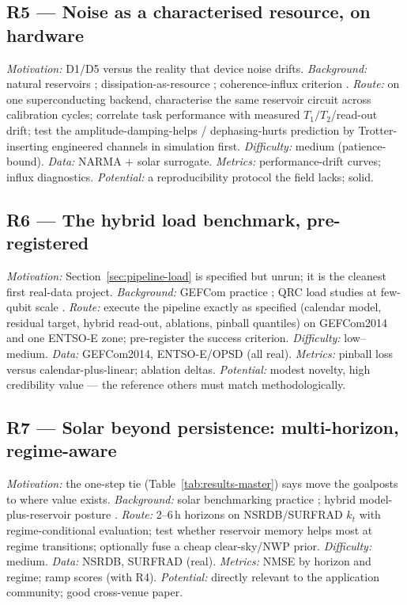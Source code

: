 \subsection*{R5 --- Noise as a characterised resource, on hardware}
\emph{Motivation:} D1/D5 versus the reality that device noise drifts.
\emph{Background:} natural reservoirs \citep{suzuki2022natural};
dissipation-as-resource \citep{sannia2024dissipation}; coherence-influx
criterion \citep{kobayashi2024coherence}. \emph{Route:} on one
superconducting backend, characterise the same reservoir circuit across
calibration cycles; correlate task performance with measured
$T_1/T_2$/read-out drift; test the amplitude-damping-helps /
dephasing-hurts prediction by Trotter-inserting engineered channels in
simulation first. \emph{Difficulty:} medium (patience-bound).
\emph{Data:} NARMA + solar surrogate. \emph{Metrics:} performance-drift
curves; influx diagnostics. \emph{Potential:} a reproducibility protocol
the field lacks; solid.

\subsection*{R6 --- The hybrid load benchmark, pre-registered}
\emph{Motivation:} Section~\ref{sec:pipeline-load} is specified but unrun;
it is the cleanest first real-data project. \emph{Background:} GEFCom
practice \citep{hong2016gefcom,hong2016load}; QRC load studies at few-qubit
scale \citep{odo2026quantum}. \emph{Route:} execute the pipeline exactly as
specified (calendar model, residual target, hybrid read-out, ablations,
pinball quantiles) on GEFCom2014 and one ENTSO-E zone; pre-register the
success criterion. \emph{Difficulty:} low--medium.
\emph{Data:} GEFCom2014, ENTSO-E/OPSD (all real).
\emph{Metrics:} pinball loss versus calendar-plus-linear; ablation deltas.
\emph{Potential:} modest novelty, high credibility value --- the reference
others must match methodologically.

\subsection*{R7 --- Solar beyond persistence: multi-horizon, regime-aware}
\emph{Motivation:} the one-step tie (Table~\ref{tab:results-master}) says
move the goalposts to where value exists. \emph{Background:} solar
benchmarking practice \citep{yang2018history,inman2013solar}; hybrid
model-plus-reservoir posture \citep{pathak2018hybrid}.
\emph{Route:} 2--6\,h horizons on NSRDB/SURFRAD $k_t$ with
regime-conditional evaluation; test whether reservoir memory helps most at
regime transitions; optionally fuse a cheap clear-sky/NWP prior.
\emph{Difficulty:} medium. \emph{Data:} NSRDB, SURFRAD (real).
\emph{Metrics:} NMSE by horizon and regime; ramp scores (with R4).
\emph{Potential:} directly relevant to the application community; good
cross-venue paper.

